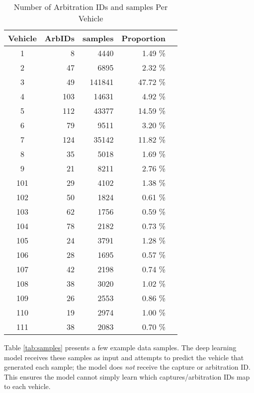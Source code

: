 \documentclass[../main.tex]{subfiles}
\begin{document}
\begin{table}
    \caption{Number of Arbitration IDs and samples Per Vehicle}
    \centering
    \label{tab:sample-metadata}
    \begin{tabular}{|c|r|r|r|r|}
    \hline
    \textbf{Vehicle} & \textbf{ArbIDs} & \textbf{samples} & \textbf{Proportion} \\
    \hline
    1   & 8   & 4440   & 1.49  \% \\
    2   & 47  & 6895   & 2.32  \% \\
    3   & 49  & 141841 & 47.72 \% \\
    4   & 103 & 14631  & 4.92  \% \\
    5   & 112 & 43377  & 14.59 \% \\
    6   & 79  & 9511   & 3.20  \% \\
    7   & 124 & 35142  & 11.82 \% \\
    8   & 35  & 5018   & 1.69  \% \\
    9   & 21  & 8211   & 2.76  \% \\
    101 & 29 & 4102    & 1.38  \% \\
    102 & 50 & 1824    & 0.61  \% \\
    103 & 62 & 1756    & 0.59  \% \\
    104 & 78 & 2182    & 0.73  \% \\
    105 & 24 & 3791    & 1.28  \% \\
    106 & 28 & 1695    & 0.57  \% \\
    107 & 42 & 2198    & 0.74  \% \\
    108 & 38 & 3020    & 1.02  \% \\
    109 & 26 & 2553    & 0.86  \% \\
    110 & 19 & 2974    & 1.00  \% \\
    111 & 38 & 2083    & 0.70  \% \\
    \hline
    \end{tabular}
\end{table}


Table \ref{tab:samples} presents a few example data samples. The deep learning model receives these samples as input and attempts to predict the vehicle that generated each sample; the model does \textit{not} receive the capture or arbitration ID. This ensures the model cannot simply learn which captures/arbitration IDs map to each vehicle.
\end{document}

